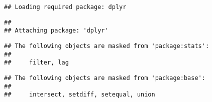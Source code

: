 \documentclass[
]{article}
\begin{document}
\begin{verbatim}
## Loading required package: dplyr
\end{verbatim}

\begin{verbatim}
## 
## Attaching package: 'dplyr'
\end{verbatim}

\begin{verbatim}
## The following objects are masked from 'package:stats':
## 
##     filter, lag
\end{verbatim}

\begin{verbatim}
## The following objects are masked from 'package:base':
## 
##     intersect, setdiff, setequal, union
\end{verbatim}
\end{document}
